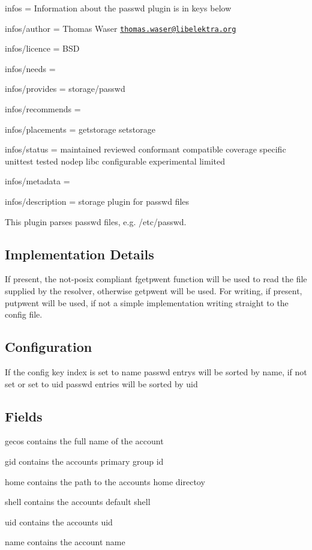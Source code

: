 
\begin{DoxyItemize}
\item infos = Information about the passwd plugin is in keys below
\item infos/author = Thomas Waser \href{mailto:thomas.waser@libelektra.org}{\tt thomas.\+waser@libelektra.\+org}
\item infos/licence = B\+SD
\item infos/needs =
\item infos/provides = storage/passwd
\item infos/recommends =
\item infos/placements = getstorage setstorage
\item infos/status = maintained reviewed conformant compatible coverage specific unittest tested nodep libc configurable experimental limited
\item infos/metadata =
\item infos/description = storage plugin for passwd files
\end{DoxyItemize}

This plugin parses {\ttfamily passwd} files, e.\+g. {\ttfamily /etc/passwd}.

\subsection*{Implementation Details}

If present, the not-\/posix compliant {\ttfamily fgetpwent} function will be used to read the file supplied by the resolver, otherwise {\ttfamily getpwent} will be used. For writing, if present, {\ttfamily putpwent} will be used, if not a simple implementation writing straight to the config file.

\subsection*{Configuration}

If the config key {\ttfamily index} is set to {\ttfamily name} passwd entrys will be sorted by name, if not set or set to {\ttfamily uid} passwd entries will be sorted by uid

\subsection*{Fields}


\begin{DoxyItemize}
\item {\ttfamily gecos} contains the full name of the account
\item {\ttfamily gid} contains the accounts primary group id
\item {\ttfamily home} contains the path to the accounts home directoy
\item {\ttfamily shell} contains the accounts default shell
\item {\ttfamily uid} contains the accounts uid
\item {\ttfamily name} contains the account name
\end{DoxyItemize}

